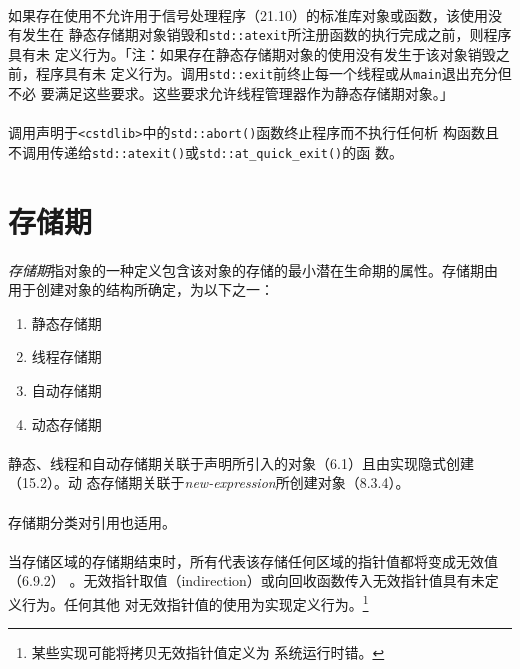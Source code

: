 \paragraph{}
如果存在使用不允许用于信号处理程序（21.10）的标准库对象或函数，该使用没有发生在
静态存储期对象销毁和\texttt{std::atexit}所注册函数的执行完成之前，则程序具有未
定义行为。「注：如果存在静态存储期对象的使用没有发生于该对象销毁之前，程序具有未
定义行为。调用\texttt{std::exit}前终止每一个线程或从\texttt{main}退出充分但不必
要满足这些要求。这些要求允许线程管理器作为静态存储期对象。」

\paragraph{}
调用声明于\texttt{<cstdlib>}中的\texttt{std::abort()}函数终止程序而不执行任何析
构函数且不调用传递给\texttt{std::atexit()}或\texttt{std::at\_quick\_exit()}的函
数。

\section{存储期}

\paragraph{}
\textit{存储期}指对象的一种定义包含该对象的存储的最小潜在生命期的属性。存储期由
用于创建对象的结构所确定，为以下之一：
\begin{enumerate}
  \item{静态存储期}
  \item{线程存储期}
  \item{自动存储期}
  \item{动态存储期}
\end{enumerate}

\paragraph{}
静态、线程和自动存储期关联于声明所引入的对象（6.1）且由实现隐式创建（15.2）。动
态存储期关联于\textit{new-expression}所创建对象（8.3.4）。

\paragraph{}
存储期分类对引用也适用。

\paragraph{}
当存储区域的存储期结束时，所有代表该存储任何区域的指针值都将变成无效值（6.9.2）
。无效指针取值（indirection）或向回收函数传入无效指针值具有未定义行为。任何其他
对无效指针值的使用为实现定义行为。\footnote{某些实现可能将拷贝无效指针值定义为
系统运行时错。}


